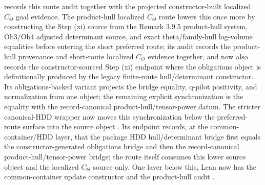 \begin{proposition}
  records this route audit together with the projected constructor-built
  localized \(C_\Theta\) goal evidence.  The product-hull localized
  \(C_\Theta\) route
  lowers this once more by constructing the Step (xi) source from the
  Remark 3.9.5 product-hull system, Ob3/Ob4 adjusted determinant source, and
  exact theta/family-hull log-volume equalities before entering the short
  preferred route; its audit records the product-hull provenance and short-route
  localized \(C_\Theta\) evidence together, and now also records the
  constructor-sourced Step (xi) endpoint where the obligations object is
  definitionally produced by the legacy finite-route hull/determinant
  constructor. Its obligations-backed variant
  projects the bridge equality, q-pilot positivity, and normalization from one
   object; the remaining
  explicit synchronization is the equality with the record-canonical
  product-hull/tensor-power datum.  The stricter canonical-HDD wrapper
  now moves this synchronization below the preferred-route surface into the
  source object
  .
  Its endpoint records, at the common-container/HDD layer, that the package HDD
  hull/determinant bridge first equals the constructor-generated obligations
  bridge and then the record-canonical product-hull/tensor-power bridge; the
  route itself consumes this lower source object and the localized \(C_\Theta\)
  source only.  One layer below this, Lean now has the common-container update
  constructor
  and the product-hull audit
  .

\end{proposition}
